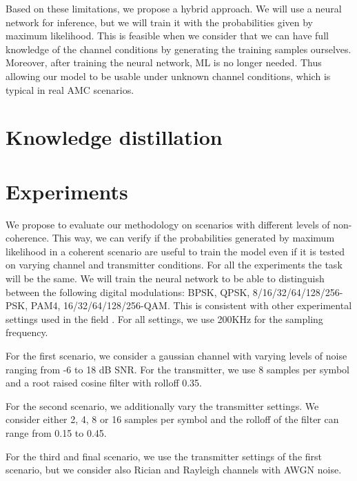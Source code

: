 \documentclass[conference]{IEEEtran}
\begin{document}
Based on these limitations, we propose a hybrid approach. We will use a neural network for inference, but we will train it with the probabilities given by maximum likelihood. This is feasible when we consider that we can have full knowledge of the channel conditions by generating the training samples ourselves. Moreover, after training the neural network, ML is no longer needed. Thus allowing our model to be usable under unknown channel conditions, which is typical in real AMC scenarios.


\section{Knowledge distillation}

\section{Experiments}

We propose to evaluate our methodology on scenarios with different levels of non-coherence. This way, we can verify if the probabilities generated by maximum likelihood in a coherent scenario are useful to train the model even if it is tested on varying channel and transmitter conditions. 
For all the experiments the task will be the same. We will train the neural network to be able to distinguish between the following digital modulations: BPSK, QPSK, 8/16/32/64/128/256-PSK, PAM4, 16/32/64/128/256-QAM. This is consistent with other experimental settings used in the field \cite{}.  %
For all settings, we use 200KHz for the sampling frequency.

For the first scenario, we consider a gaussian channel with varying levels of noise ranging from -6 to 18 dB SNR. For the transmitter, we use 8 samples per symbol and a root raised cosine filter with rolloff 0.35.

For the second scenario, we additionally vary the transmitter settings. We consider either 2, 4, 8 or 16 samples per symbol and the rolloff of the filter can range from 0.15 to 0.45.

For the third and final scenario, we use the transmitter settings of the first scenario, but we consider also Rician and Rayleigh channels with AWGN noise. %






\end{document}
